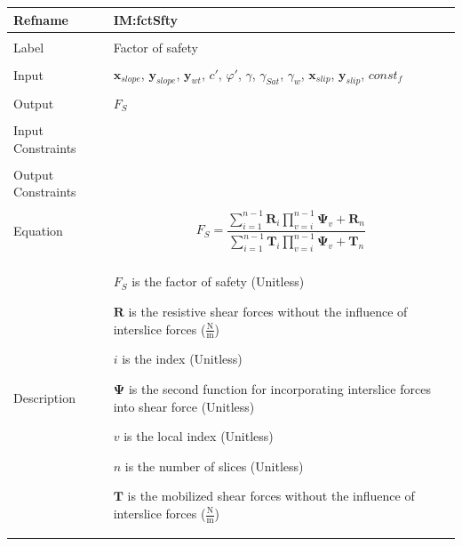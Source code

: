 \documentclass[12pt]{article}
\begin{document}
\noindent \begin{minipage}{\textwidth}
\begin{tabular}{p{} p{}}
\toprule \textbf{Refname} & \textbf{IM:fctSfty}
\label{IM:fctSfty}
\\ \midrule \\
Label & Factor of safety
\\ \midrule \\
Input & ${\mathbf{x}_{slope}}$, ${\mathbf{y}_{slope}}$, ${\mathbf{y}_{wt}}$, $c'$, $φ'$, $γ$, ${γ_{Sat}}$, ${γ_{w}}$, ${\mathbf{x}_{slip}}$, ${\mathbf{y}_{slip}}$, $const_f$
\\ \midrule \\
Output & ${F_{S}}$
\\ \midrule \\
Input Constraints & 
\\ \midrule \\
Output Constraints & 
\\ \midrule \\
Equation & \begin{displaymath}
           {F_{S}}=\frac{\displaystyle\sum_{i=1}^{n-1}{{\mathbf{R}}_{i} \displaystyle\prod_{v=i}^{n-1}{{\mathbf{Ψ}}_{v}}}+{\mathbf{R}}_{n}}{\displaystyle\sum_{i=1}^{n-1}{{\mathbf{T}}_{i} \displaystyle\prod_{v=i}^{n-1}{{\mathbf{Ψ}}_{v}}}+{\mathbf{T}}_{n}}
           \end{displaymath}
\\ \midrule \\
Description & \begin{symbDescription}
              \item{${F_{S}}$ is the factor of safety (Unitless)}
              \item{$\mathbf{R}$ is the resistive shear forces without the influence of interslice forces ($\frac{\text{N}}{\text{m}}$)}
              \item{$i$ is the index (Unitless)}
              \item{$\mathbf{Ψ}$ is the second function for incorporating interslice forces into shear force (Unitless)}
              \item{$v$ is the local index (Unitless)}
              \item{$n$ is the number of slices (Unitless)}
              \item{$\mathbf{T}$ is the mobilized shear forces without the influence of interslice forces ($\frac{\text{N}}{\text{m}}$)}
              \end{symbDescription}

\end{tabular}
\end{minipage}
\end{document}
